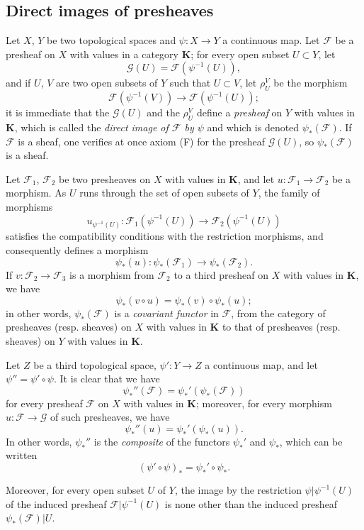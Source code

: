 \subsection{Direct images of presheaves}
\label{subsection:0.3.4}

\begin{env}[3.4.1]
\label{0.3.4.1}
Let $X$, $Y$ be two topological spaces and $\psi:X\to Y$ a continuous
map. Let $\mathcal{F}$ be a presheaf on $X$ with values in a
category $\boldsymbol{K}$; for every open subset $U\subset Y$, let
\[
  \mathcal{G}(U)=\mathcal{F}(\psi^{-1}(U)),
\]
and if $U$, $V$ are two open subsets of $Y$ such that $U\subset V$, let
$\rho_U^V$ be the morphism
\[
  \mathcal{F}(\psi^{-1}(V))\to\mathcal{F}(\psi^{-1}(U));
\]
it is immediate that the $\mathcal{G}(U)$ and the $\rho_U^V$ define a
\emph{presheaf} on $Y$ with values in $\boldsymbol{K}$, which is called
the \emph{direct image of $\mathcal{F}$ by $\psi$} and which is denoted
$\psi_*(\mathcal{F})$. If $\mathcal{F}$ is a sheaf, one verifies at once
axiom (F) for the presheaf $\mathcal{G}(U)$, so
$\psi_*(\mathcal{F})$ is a sheaf.
\end{env}

\begin{env}[3.4.2]
\label{0.3.4.2}
Let $\mathcal{F}_1$, $\mathcal{F}_2$ be two presheaves on $X$ with values
in $\boldsymbol{K}$, and let $u:\mathcal{F}_1\to\mathcal{F}_2$ be a morphism.
As $U$ runs through the set of open subsets of $Y$, the family of
morphisms
\[
  u_{\psi^{-1}(U)}:
  \mathcal{F}_1(\psi^{-1}(U))\to\mathcal{F}_2(\psi^{-1}(U))
\]
satisfies the compatibility conditions with the restriction morphisms,
and consequently defines a morphism
\[
  \psi_*(u):\psi_*(\mathcal{F}_1)\to\psi_*(\mathcal{F}_2).
\]
If $v:\mathcal{F}_2\to\mathcal{F}_3$ is a morphism from $\mathcal{F}_2$ to
a third presheaf on $X$ with values in $\boldsymbol{K}$, we have
\[
  \psi_*(v\circ u)=\psi_*(v)\circ\psi_*(u);
\]
in other words, $\psi_*(\mathcal{F})$ is a \emph{covariant functor} in
$\mathcal{F}$, from the category of presheaves (resp. sheaves) on $X$ with
values in $\boldsymbol{K}$ to that of presheaves (resp. sheaves) on
$Y$ with values in $\boldsymbol{K}$.
\end{env}

\begin{env}[3.4.3]
\label{0.3.4.3}
Let $Z$ be a third topological space, $\psi':Y\to Z$ a continuous
map, and let $\psi''=\psi'\circ\psi$. It is clear that we have
\[
  \psi_*''(\mathcal{F})=\psi_*'(\psi_*(\mathcal{F}))
\]
for every presheaf $\mathcal{F}$ on $X$ with values in $\boldsymbol{K}$;
moreover, for every morphism $u:\mathcal{F}\to\mathcal{G}$ of such presheaves,
we have
\[
  \psi_*''(u)=\psi_*'(\psi_*(u)).
\]
In other words, $\psi_*''$ is the \emph{composite} of the functors $\psi_*'$
and $\psi_*$, which can be written
\[
  (\psi'\circ\psi)_*=\psi_*'\circ\psi_*.
\]

Moreover, for every open subset $U$ of $Y$, the image by the restriction
$\psi|\psi^{-1}(U)$ of the induced presheaf
$\mathcal{F}|\psi^{-1}(U)$ is none other than the induced presheaf
$\psi_*(\mathcal{F})|U$.
\end{env}


